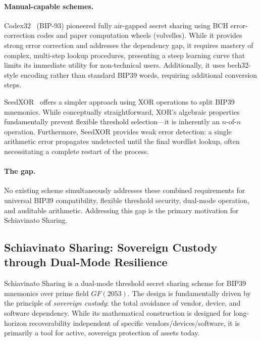 \documentclass[11pt]{article}
\begin{document}
\paragraph{Manual-capable schemes.} Codex32~\cite{codex32} (BIP-93) pioneered fully air-gapped secret sharing using BCH error-correction codes and paper computation wheels (volvelles). While it provides strong error correction and addresses the dependency gap, it requires mastery of complex, multi-step lookup procedures, presenting a steep learning curve that limits its immediate utility for non-technical users. Additionally, it uses bech32-style encoding rather than standard BIP39 words, requiring additional conversion steps.

SeedXOR~\cite{seedxor} offers a simpler approach using XOR operations to split BIP39 mnemonics. While conceptually straightforward, XOR's algebraic properties fundamentally prevent flexible threshold selection---it is inherently an $n$-of-$n$ operation. Furthermore, SeedXOR provides weak error detection: a single arithmetic error propagates undetected until the final wordlist lookup, often necessitating a complete restart of the process.

\paragraph{The gap.} No existing scheme simultaneously addresses these combined requirements for universal BIP39 compatibility, flexible threshold security, dual-mode operation, and auditable arithmetic. Addressing this gap is the primary motivation for Schiavinato Sharing.

\subsection{Schiavinato Sharing: Sovereign Custody through Dual-Mode Resilience}

Schiavinato Sharing is a dual-mode threshold secret sharing scheme for BIP39 mnemonics over prime field $GF(2053)$. The design is fundamentally driven by the principle of \textit{sovereign custody}: the total avoidance of vendor, device, and software dependency. While its mathematical construction is designed for long-horizon recoverability independent of specific vendors/devices/software, it is primarily a tool for active, sovereign protection of assets today.
\end{document}
